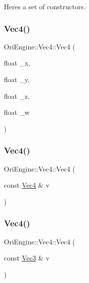 Here\textquotesingle{}s a set of constructors. 

\hypertarget{struct_ori_engine_1_1_vec4_af1620f14a897f7a9f94fbcd1e91fb9de}{}\label{struct_ori_engine_1_1_vec4_af1620f14a897f7a9f94fbcd1e91fb9de} 
\subsubsection{\texorpdfstring{Vec4()}{Vec4()}\hspace{0.1cm}{\footnotesize\ttfamily [2/4]}}
{\footnotesize\ttfamily Ori\+Engine\+::\+Vec4\+::\+Vec4 (\begin{DoxyParamCaption}\item[{float}]{\+\_\+x,  }\item[{float}]{\+\_\+y,  }\item[{float}]{\+\_\+z,  }\item[{float}]{\+\_\+w }\end{DoxyParamCaption})\hspace{0.3cm}{\ttfamily [inline]}}

\hypertarget{struct_ori_engine_1_1_vec4_ae1591588e904abd9bd0772d81a50194f}{}\label{struct_ori_engine_1_1_vec4_ae1591588e904abd9bd0772d81a50194f} 
\subsubsection{\texorpdfstring{Vec4()}{Vec4()}\hspace{0.1cm}{\footnotesize\ttfamily [3/4]}}
{\footnotesize\ttfamily Ori\+Engine\+::\+Vec4\+::\+Vec4 (\begin{DoxyParamCaption}\item[{const \hyperlink{struct_ori_engine_1_1_vec4}{Vec4} \&}]{v }\end{DoxyParamCaption})\hspace{0.3cm}{\ttfamily [inline]}}

\hypertarget{struct_ori_engine_1_1_vec4_a703f1e094f1507602736d338bbe16f71}{}\label{struct_ori_engine_1_1_vec4_a703f1e094f1507602736d338bbe16f71} 
\subsubsection{\texorpdfstring{Vec4()}{Vec4()}\hspace{0.1cm}{\footnotesize\ttfamily [4/4]}}
{\footnotesize\ttfamily Ori\+Engine\+::\+Vec4\+::\+Vec4 (\begin{DoxyParamCaption}\item[{const \hyperlink{struct_ori_engine_1_1_vec3}{Vec3} \&}]{v }\end{DoxyParamCaption})\hspace{0.3cm}{\ttfamily [inline]}}



